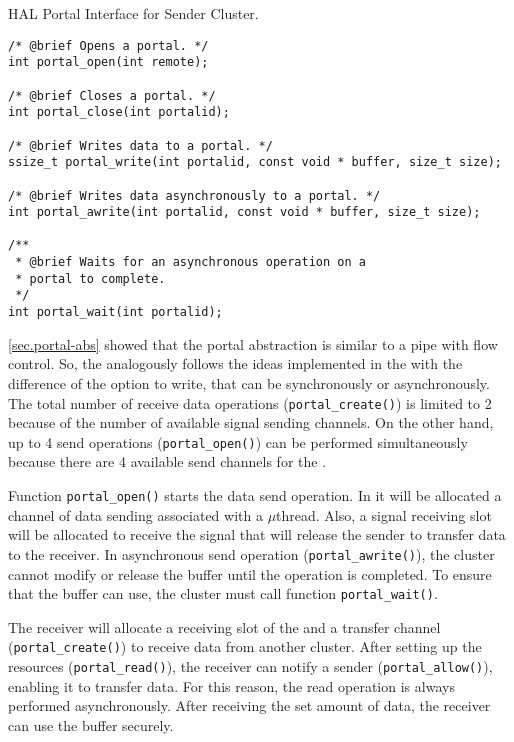 \begin{listing}[!tb]
\caption{HAL Portal Interface for Sender Cluster.}
\label{code:portal-sender}
\begin{verbatim}
/* @brief Opens a portal. */
int portal_open(int remote);

/* @brief Closes a portal. */
int portal_close(int portalid);

/* @brief Writes data to a portal. */
ssize_t portal_write(int portalid, const void * buffer, size_t size);

/* @brief Writes data asynchronously to a portal. */
int portal_awrite(int portalid, const void * buffer, size_t size);

/**
 * @brief Waits for an asynchronous operation on a
 * portal to complete.
 */
int portal_wait(int portalid);
\end{verbatim}
\end{listing}

				\autoref{sec.portal-abs} showed that the portal abstraction is similar to
				a \posix pipe with flow control.
				So, the \portal analogously follows the ideas implemented
				in the \mailbox with the difference of the option to write,
				that can be synchronously or asynchronously.
				The total number of receive data operations (\texttt{portal\_create()})
				is limited to 2 because of the number of available signal sending channels.
				On the other hand, up to 4 send operations (\texttt{portal\_open()})
				can be performed simultaneously because there are 4 available send
				channels for the \portal.

				Function \texttt{portal\_open()} starts the data send operation.
				In it will be allocated a channel of data sending associated with
				a $\mu$thread.
				Also, a signal receiving slot will be allocated to receive the
				signal that will release the sender to transfer data to the receiver.
				In asynchronous send operation (\texttt{portal\_awrite()}), the cluster
				cannot modify or release the buffer until the operation is completed.
				To ensure that the buffer can use, the cluster must call function \texttt{portal\_wait()}.

				The receiver will allocate a receiving slot of the \dnoc and a transfer
				channel (\texttt{portal\_create()}) to receive data from another cluster.
				After setting up the resources (\texttt{portal\_read()}), the receiver
				can notify a sender (\texttt{portal\_allow()}), enabling it to transfer data.
				For this reason, the read operation is always performed asynchronously.
				After receiving the set amount of data, the receiver can use the buffer securely.

